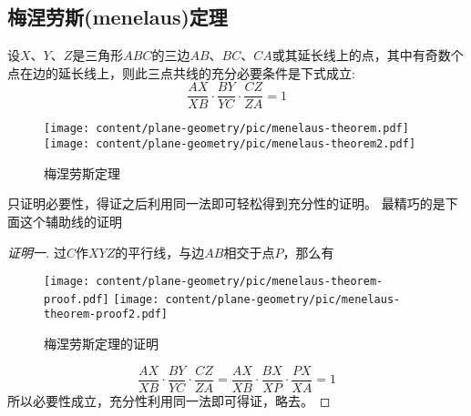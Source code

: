 \subsection{梅涅劳斯(menelaus)定理}
\label{sec:menelaus-theorem}

\begin{theorem}[梅涅劳斯定理]
  设$X$、$Y$、$Z$是三角形$ABC$的三边$AB$、$BC$、$CA$或其延长线上的点，其中有奇数个点在边的延长线上，则此三点共线的充分必要条件是下式成立:
  \begin{equation}
    \label{eq:menelaus-theorem}
    \frac{AX}{XB} \cdot \frac{BY}{YC} \cdot \frac{CZ}{ZA} = 1
 \end{equation}
\end{theorem}
 
\begin{figure}[htbp]
\centering
\texttt{[image: content/plane-geometry/pic/menelaus-theorem.pdf]}
\texttt{[image: content/plane-geometry/pic/menelaus-theorem2.pdf]}
\caption{梅涅劳斯定理}
\label{fig:menelaus-theorem}
\end{figure}
 

只证明必要性，得证之后利用同一法即可轻松得到充分性的证明。
最精巧的是下面这个辅助线的证明
\begin{proof}[证明一]
  过$C$作$XYZ$的平行线，与边$AB$相交于点$P$，那么有
 
\begin{figure}[htbp]
\centering
\texttt{[image: content/plane-geometry/pic/menelaus-theorem-proof.pdf]}
\texttt{[image: content/plane-geometry/pic/menelaus-theorem-proof2.pdf]}
\caption{梅涅劳斯定理的证明}
\label{fig:menelaus-theorem-proof}
\end{figure}
 

  \begin{equation*}
    \frac{AX}{XB} \cdot \frac{BY}{YC} \cdot \frac{CZ}{ZA} =
    \frac{AX}{XB} \cdot \frac{BX}{XP} \cdot \frac{PX}{XA} = 1
  \end{equation*}
所以必要性成立，充分性利用同一法即可得证，略去。
\end{proof}

